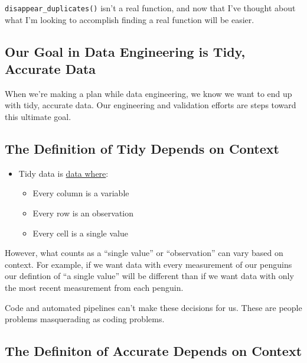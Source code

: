 \documentclass[
  letterpaper,
  DIV=11,
  numbers=noendperiod]{scrreprt}
\providecommand{\tightlist}{%
  \setlength{\itemsep}{0pt}\setlength{\parskip}{0pt}}\usepackage{longtable,booktabs,array}
\begin{document}
\texttt{disappear\_duplicates()} isn't a real function, and now that
I've thought about what I'm looking to accomplish finding a real
function will be easier.

\hypertarget{our-goal-in-data-engineering-is-tidy-accurate-data}{%
\subsection{Our Goal in Data Engineering is Tidy, Accurate
Data}\label{our-goal-in-data-engineering-is-tidy-accurate-data}}

When we're making a plan while data engineering, we know we want to end
up with tidy, accurate data. Our engineering and validation efforts are
steps toward this ultimate goal.

\hypertarget{the-definition-of-tidy-depends-on-context}{%
\subsection{The Definition of Tidy Depends on
Context}\label{the-definition-of-tidy-depends-on-context}}

\begin{itemize}
\tightlist
\item
  Tidy data is
  \href{https://cran.r-project.org/web/packages/tidyr/vignettes/tidy-data.html}{data
  where}:

  \begin{itemize}
  \tightlist
  \item
    Every column is a variable
  \item
    Every row is an observation
  \item
    Every cell is a single value
  \end{itemize}
\end{itemize}

However, what counts as a ``single value'' or ``observation'' can vary
based on context. For example, if we want data with every measurement of
our penguins our defintion of ``a single value'' will be different than
if we want data with only the most recent measurement from each penguin.

Code and automated pipelines can't make these decisions for us. These
are people problems masquerading as coding problems.

\hypertarget{the-definiton-of-accurate-depends-on-context}{%
\subsection{The Definiton of Accurate Depends on
Context}\label{the-definiton-of-accurate-depends-on-context}}
\end{document}
